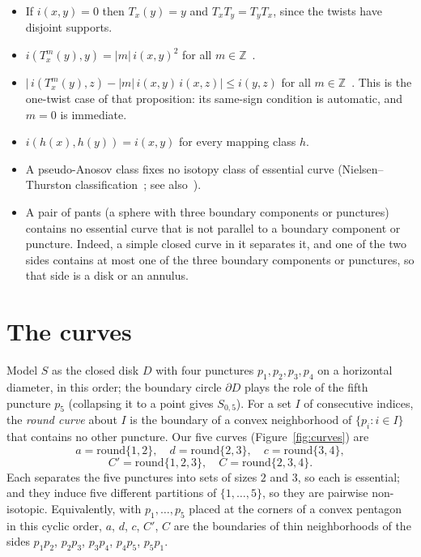 \documentclass[11pt]{article}
\theoremstyle{remark}
\newcommand{\Z}{\mathbb{Z}}
\begin{document}
\begin{itemize}
\item[(D)] If $i(x,y)=0$ then $T_x(y)=y$ and $T_xT_y=T_yT_x$, since the twists
  have disjoint supports.
\item[(I1)] $i(T_x^m(y),y)=|m|\,i(x,y)^2$ for all $m\in\Z$~\cite[Prop.~3.2]{FM}.
\item[(I2)] $\bigl|\,i(T_x^m(y),z)-|m|\,i(x,y)\,i(x,z)\bigr|\le i(y,z)$
  for all $m\in\Z$~\cite[Prop.~3.4]{FM}. This is the one-twist
  case of that proposition: its same-sign condition is automatic, and
  $m=0$ is immediate.
\item[(N)] $i(h(x),h(y))=i(x,y)$ for every mapping class $h$.
\item[(P)] A pseudo-Anosov class fixes no isotopy class of essential curve
  (Nielsen--Thurston classification~\cite[Thm.~13.2]{FM}; see
  also~\cite{FLP}).
\item[(Q)] A pair of pants (a sphere with three boundary components or
  punctures) contains no essential curve that is not parallel to a boundary
  component or puncture. Indeed, a simple closed curve in it separates it,
  and one of the two sides contains at most one of the three boundary
  components or punctures, so that side is a disk or an annulus.
\end{itemize}

\section{The curves}\label{sec:curves}

Model $S$ as the closed disk $D$ with four punctures $p_1,p_2,p_3,p_4$ on a
horizontal diameter, in this order; the boundary circle $\partial D$ plays
the role of the fifth puncture $p_5$ (collapsing it to a point gives
$S_{0,5}$). For a set $I$ of consecutive indices, the
\emph{round curve} about $I$ is the boundary of a convex neighborhood of
$\{p_i:i\in I\}$ that contains no other puncture. Our five curves
(Figure~\ref{fig:curves}) are
\[
a=\text{round}\{1,2\},\quad d=\text{round}\{2,3\},\quad
c=\text{round}\{3,4\},
\]
\[
C'=\text{round}\{1,2,3\},\quad C=\text{round}\{2,3,4\}.
\]
Each separates the five punctures into sets of sizes $2$ and $3$, so each is
essential; and they induce five different partitions of $\{1,\dots,5\}$, so
they are pairwise non-isotopic. Equivalently, with $p_1,\dots,p_5$ placed at
the corners of a convex pentagon in this cyclic order, $a$, $d$, $c$, $C'$,
$C$ are the boundaries of thin neighborhoods of the sides $p_1p_2$,
$p_2p_3$, $p_3p_4$, $p_4p_5$, $p_5p_1$.
\end{document}
